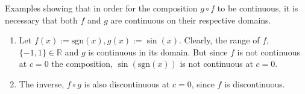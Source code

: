 \documentclass[boxes, qed]{homework}
\begin{document}
\begin{problem}Examples showing that in order for the composition $g\circ{f}$
  to be continuous, it is necessary that both $f$ and $g$ are 
  continuous on their respective domains.
\end{problem}
\begin{solution}
  \begin{enumerate}
    \item Let $f(x) := \mathrm{sgn}(x), 
      g(x) := \sin(x)$. 
      Clearly, the range of $f$, $\{-1,1\}\in{\mathbb{R}}$ and
      $g$ is continuous in its domain. But since
      $f$ is not continuous at $c=0$ the composition, $\sin(\mathrm{sgn}(x))$ 
      is not continuous at $c=0$.
    \item The inverse, $f\circ{g}$ is also discontinuous at
      $c=0$, since $f$ is discontinuous. 
  \end{enumerate}
\end{solution}
\end{document}
